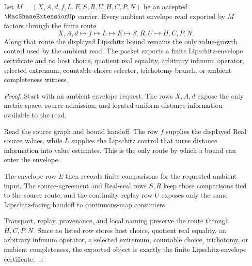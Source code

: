 \begin{theorem}
\label{thm:macshane-extension-lipschitz-envelope}
Let $M=(X,A,d,f,L,E,S,R,U,H,C,P,N)$ be an accepted $\MacShaneExtensionUp$ carrier. Every ambient envelope read exported by $M$ factors through the finite route
$$
X,A,d\longmapsto f\longmapsto L\longmapsto E\longmapsto S,R,U\longmapsto H,C,P,N .
$$
Along that route the displayed Lipschitz bound remains the only value-growth control used by the ambient read. The packet exports a finite Lipschitz-envelope certificate and no host choice, quotient real equality, arbitrary infimum operator, selected extremum, countable-choice selector, trichotomy branch, or ambient completeness witness.
\end{theorem}
\begin{proof}
Start with an ambient envelope request. The rows $X,A,d$ expose the only metric-space, source-admission, and located-uniform distance information available to the read.

Read the source graph and bound handoff. The row $f$ supplies the displayed Real source values, while $L$ supplies the Lipschitz control that turns distance information into value estimates. This is the only route by which a bound can enter the envelope.

The envelope row $E$ then records finite comparisons for the requested ambient input. The source-agreement and Real-seal rows $S,R$ keep those comparisons tied to the source route, and the continuity replay row $U$ exposes only the same Lipschitz-facing handoff to continuous-map consumers.

Transport, replay, provenance, and local naming preserve the route through $H,C,P,N$. Since no listed row stores host choice, quotient real equality, an arbitrary infimum operator, a selected extremum, countable choice, trichotomy, or ambient completeness, the exported object is exactly the finite Lipschitz-envelope certificate.
\end{proof}



